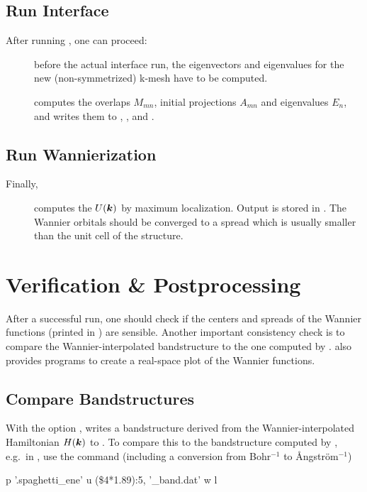 \subsection{Run Interface}
After running \initwiiw, one can proceed:
\begin{description}
\item[] before the actual interface run, the
  eigenvectors and eigenvalues for the new (non-symmetrized) k-mesh
  have to be computed.
\item[] computes the overlaps $M_{mn}$, initial
  projections $A_{mn}$ and eigenvalues $E_n$, and writes them to
  , , and .
\end{description}


\subsection{Run Wannierization}
Finally,
\begin{description}
\item[] computes the $U(\boldsymbol k)$ by maximum
  localization.  Output is stored in . The Wannier
  orbitals should be converged to a spread which is usually smaller
  than the unit cell of the structure.
 \end{description}


\section{Verification \& Postprocessing}
\label{sec:quickstart_post}

After a successful \wannier run, one should check if the centers and
spreads of the Wannier functions (printed in ) are
sensible.  Another important consistency check is to compare the
Wannier-interpolated bandstructure to the one computed by \wien.
\Wtow also provides programs to create a real-space plot of the
Wannier functions.

\subsection{Compare Bandstructures}
With the option , \wannier writes a bandstructure
derived from the Wannier-inter\-po\-la\-ted Hamiltonian $H(\boldsymbol k)$ to
.  To compare this to the bandstructure
computed by , e.g.\ in , use the command
(including a conversion from Bohr$^{-1}$ to \AA{}ng\-str\"om$^{-1}$)
\begin{usage}
  p '\case.spaghetti\_ene' u (\$4*1.89):5, '\case{}\_band.dat' w l
\end{usage}

